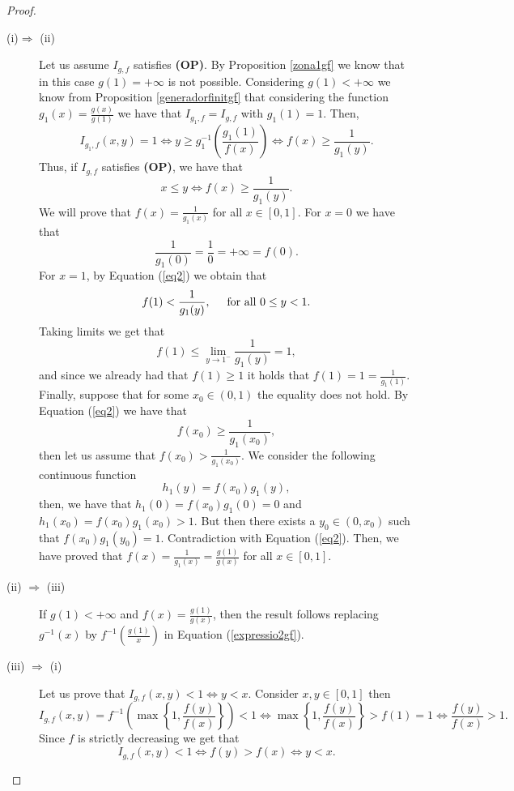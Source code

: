 \begin{proof} \hspace{0.5cm}
	\begin{description}
	\item[(i)$\Rightarrow$ (ii)] Let us assume $I_{g,f}$ satisfies {\bf (OP)}. By Proposition \ref{zona1gf} we know that in this case $g(1)=+ \infty$ is not possible. Considering $g(1) < + \infty$ we know from Proposition \ref{generadorfinitgf} that considering the function $g_1(x)=\frac{g(x)}{g(1)}$ we have that $I_{g_1,f}=I_{g,f}$ with $g_1(1)=1$. Then,
	\begin{equation*}
		I_{g_1,f}(x,y)=1 \Leftrightarrow y \geq g_1^{-1}\left(\frac{g_1(1)}{f(x)}\right) \Leftrightarrow f(x) \geq \frac{1}{g_1(y)}.
	\end{equation*}
	Thus, if $I_{g,f}$ satisfies {\bf (OP)}, we have that
	\begin{equation}
		x \leq y \Leftrightarrow f(x) \geq \frac{1}{g_1(y)}.
		\label{eq2}
	\end{equation}
	We will prove that $f(x)= \frac{1}{g_1(x)}$ for all $x \in [0,1]$. For $x=0$ we have that
	$$ \frac{1}{g_1(0)}=\frac{1}{0} =+ \infty = f(0).$$
	For $x=1$, by Equation (\ref{eq2}) we obtain that
	$$f(1) < \frac{1}{g_1(y)}, \hspace{0.5cm} \text{for all } 0 \leq y <1.$$
	Taking limits we get that
	$$f(1) \leq \lim_{y \to 1^{-}} \frac{1}{g_1(y)}=1,$$
	and since we already had that $f(1)\geq 1$ it holds that $f(1)=1=\frac{1}{g_1(1)}$. Finally, suppose that for some $x_0 \in (0,1)$ the equality does not hold. By Equation (\ref{eq2}) we have that
	$$f(x_0) \geq \frac{1}{g_1(x_0)},$$
	then let us assume that $f(x_0)> \frac{1}{g_1(x_0)}$. We consider the following continuous function
	$$ h_1(y)=f(x_0)g_1(y),$$
	\noindent then, we have that $h_1(0)=f(x_0)g_1(0)=0$ and $h_1(x_0)=f(x_0)g_1(x_0) > 1$. But then there exists a $y_0 \in (0, x_0)$ such that $f(x_0)g_1(y_0)=1$. Contradiction with Equation (\ref{eq2}). Then, we have proved that $f(x)=\frac{1}{g_1(x)}=\frac{g(1)}{g(x)}$ for all $x \in [0,1]$.\\
	\item[(ii) $\Rightarrow$ (iii)] If $g(1) < + \infty$ and $f(x)=\frac{g(1)}{g(x)}$, then the result follows replacing $g^{-1}(x)$ by $f^{-1}\left(\frac{g(1)}{x}\right)$ in Equation (\ref{expressio2gf}).\\
	\item[(iii) $\Rightarrow$ (i)] Let us prove that $I_{g,f}(x,y) < 1 \Leftrightarrow y<x$. Consider $x,y \in [0,1]$ then
	$$I_{g,f}(x,y)=f^{-1}\left(\max \left\lbrace 1, \frac{f(y)}{f(x)} \right\rbrace \right) < 1 \Leftrightarrow  \max \left\lbrace 1, \frac{f(y)}{f(x)}  \right\rbrace > f(1)=1 \Leftrightarrow \frac{f(y)}{f(x)} > 1. $$
	Since $f$ is strictly decreasing we get that
	$$I_{g,f}(x,y) < 1  \Leftrightarrow f(y) > f(x) \Leftrightarrow y<x.$$
	\end{description}
\end{proof}

